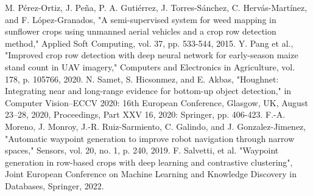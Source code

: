 \documentclass[conference]{IEEEtran}
\begin{document}
\begin{thebibliography}{00}
		 M. Pérez-Ortiz, J. Peña, P. A. Gutiérrez, J. Torres-Sánchez, C. Hervás-Martínez, and F. López-Granados, "A semi-supervised system for weed mapping in sunflower crops using unmanned aerial vehicles and a crop row detection method," Applied Soft Computing, vol. 37, pp. 533-544, 2015.
		 Y. Pang et al., "Improved crop row detection with deep neural network for early-season maize stand count in UAV imagery," Computers and Electronics in Agriculture, vol. 178, p. 105766, 2020.
		 N. Samet, S. Hicsonmez, and E. Akbas, "Houghnet: Integrating near and long-range evidence for bottom-up object detection," in Computer Vision–ECCV 2020: 16th European Conference, Glasgow, UK, August 23–28, 2020, Proceedings, Part XXV 16, 2020: Springer, pp. 406-423.
		 F.-A. Moreno, J. Monroy, J.-R. Ruiz-Sarmiento, C. Galindo, and J. Gonzalez-Jimenez, "Automatic waypoint generation to improve robot navigation through narrow spaces," Sensors, vol. 20, no. 1, p. 240, 2019.
		 F. Salvetti, et al. "Waypoint generation in row-based crops with deep learning and contrastive clustering", Joint European Conference on Machine Learning and Knowledge Discovery in Databases, Springer, 2022.
	\end{thebibliography}
	
	\vspace{12pt}
	
	
\end{document}
